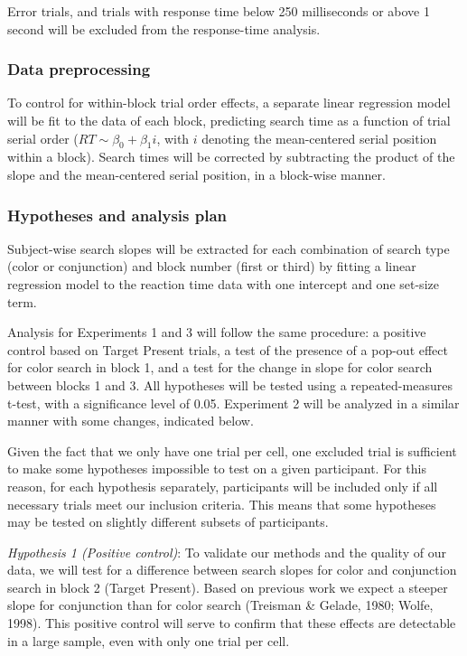 \documentclass[
  english,
  man]{apa6}
\begin{document}
Error trials, and trials with response time below 250 milliseconds or above 1 second will be excluded from the response-time analysis.

\hypertarget{data-preprocessing}{%
\subsubsection{Data preprocessing}\label{data-preprocessing}}

To control for within-block trial order effects, a separate linear regression model will be fit to the data of each block, predicting search time as a function of trial serial order (\(RT \sim \beta_0+\beta_1i\), with \(i\) denoting the mean-centered serial position within a block). Search times will be corrected by subtracting the product of the slope and the mean-centered serial position, in a block-wise manner.

\hypertarget{hypotheses-and-analysis-plan}{%
\subsubsection{Hypotheses and analysis plan}\label{hypotheses-and-analysis-plan}}

Subject-wise search slopes will be extracted for each combination of search type (color or conjunction) and block number (first or third) by fitting a linear regression model to the reaction time data with one intercept and one set-size term.

Analysis for Experiments 1 and 3 will follow the same procedure: a positive control based on Target Present trials, a test of the presence of a pop-out effect for color search in block 1, and a test for the change in slope for color search between blocks 1 and 3. All hypotheses will be tested using a repeated-measures t-test, with a significance level of 0.05. Experiment 2 will be analyzed in a similar manner with some changes, indicated below.

Given the fact that we only have one trial per cell, one excluded trial is sufficient to make some hypotheses impossible to test on a given participant. For this reason, for each hypothesis separately, participants will be included only if all necessary trials meet our inclusion criteria. This means that some hypotheses may be tested on slightly different subsets of participants.

\emph{Hypothesis 1 (Positive control)}: To validate our methods and the quality of our data, we will test for a difference between search slopes for color and conjunction search in block 2 (Target Present). Based on previous work we expect a steeper slope for conjunction than for color search (Treisman \& Gelade, 1980; Wolfe, 1998). This positive control will serve to confirm that these effects are detectable in a large sample, even with only one trial per cell.
\end{document}
